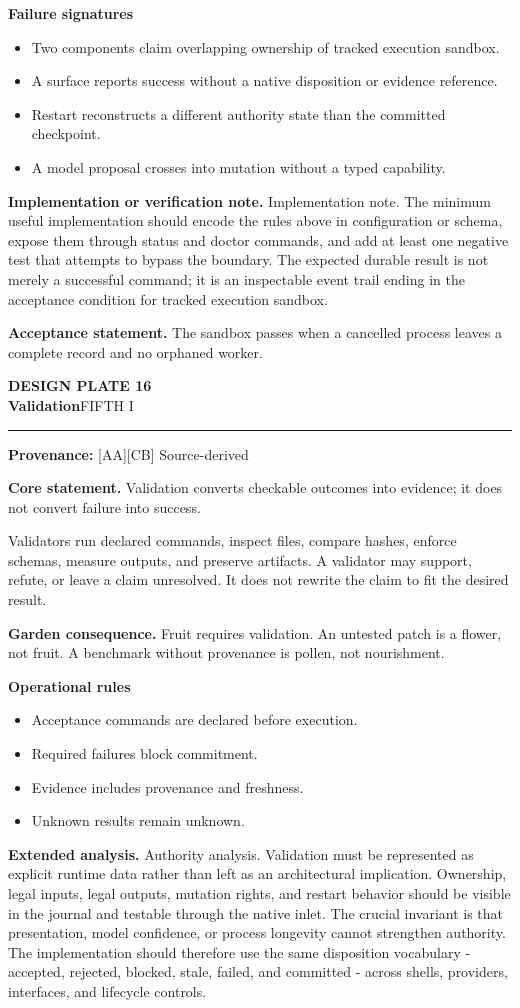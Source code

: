 \documentclass[10pt,letterpaper,oneside]{article}
\newcommand{\prov}[1]{\textcolor{gardenBlue}{\sffamily\footnotesize\textbf{Provenance:} #1}}
\newcommand{\platetitle}[3]{%
  \begin{minipage}[t][0.54in][t]{\textwidth}
  {\sffamily\bfseries\color{gardenDeep}\fontsize{9}{10}\selectfont DESIGN PLATE #1}\\[-1pt]
  {\sffamily\bfseries\color{gardenInk}\fontsize{16.5}{18}\selectfont #2}\hfill{\sffamily\color{gardenGreen}\large #3}
  \end{minipage}\vspace{-2pt}\hrule\vspace{5pt}}
\begin{document}
\textbf{Failure signatures}
\begin{itemize}
\item Two components claim overlapping ownership of tracked execution sandbox.
\item A surface reports success without a native disposition or evidence reference.
\item Restart reconstructs a different authority state than the committed checkpoint.
\item A model proposal crosses into mutation without a typed capability.
\end{itemize}
\textbf{Implementation or verification note.} Implementation note. The minimum useful implementation should encode the rules above in configuration or schema, expose them through status and doctor commands, and add at least one negative test that attempts to bypass the boundary. The expected durable result is not merely a successful command; it is an inspectable event trail ending in the acceptance condition for tracked execution sandbox.

\begin{acceptbox}
\textbf{Acceptance statement.} The sandbox passes when a cancelled process leaves a complete record and no orphaned worker.
\end{acceptbox}
\newpage
\platetitle{16}{Validation}{FIFTH I}
\prov{[AA][CB] Source-derived}
\fontsize{8.85}{10.45}\selectfont
\begin{corebox}
\textbf{Core statement.} Validation converts checkable outcomes into evidence; it does not convert failure into success.
\end{corebox}
Validators run declared commands, inspect files, compare hashes, enforce schemas, measure outputs, and preserve artifacts. A validator may support, refute, or leave a claim unresolved. It does not rewrite the claim to fit the desired result.

\textbf{Garden consequence.} Fruit requires validation. An untested patch is a flower, not fruit. A benchmark without provenance is pollen, not nourishment.

\textbf{Operational rules}
\begin{itemize}
\item Acceptance commands are declared before execution.
\item Required failures block commitment.
\item Evidence includes provenance and freshness.
\item Unknown results remain unknown.
\end{itemize}
\textbf{Extended analysis.} Authority analysis. Validation must be represented as explicit runtime data rather than left as an architectural implication. Ownership, legal inputs, legal outputs, mutation rights, and restart behavior should be visible in the journal and testable through the native inlet. The crucial invariant is that presentation, model confidence, or process longevity cannot strengthen authority. The implementation should therefore use the same disposition vocabulary - accepted, rejected, blocked, stale, failed, and committed - across shells, providers, interfaces, and lifecycle controls.
\end{document}
